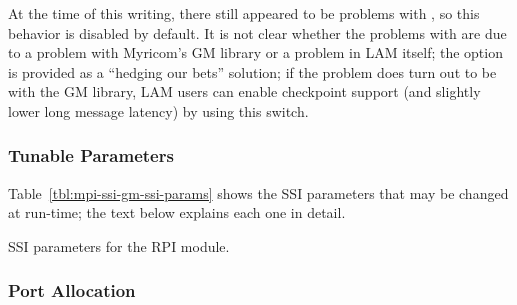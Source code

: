 At the time of this writing, there still appeared to be problems with
, so this behavior is disabled by default.  It is
not clear whether the problems with  are due to a
problem with Myricom's GM library or a problem in LAM itself; the
 option is provided as a ``hedging our
bets'' solution; if the problem does turn out to be with the GM
library, LAM users can enable checkpoint support (and slightly lower
long message latency) by using this switch.



\subsubsection{Tunable Parameters}

Table~\ref{tbl:mpi-ssi-gm-ssi-params} shows the SSI parameters that
may be changed at run-time; the text below explains each one in
detail.

\begin{table}[htbp]
  \begin{ssiparamtb}
%
%
%
%
%
%
%
  \end{ssiparamtb}
  \caption{SSI parameters for the  RPI module.}
  \label{tbl:mpi-ssi-gm-ssi-params}
\end{table}


\subsubsection{Port Allocation}

